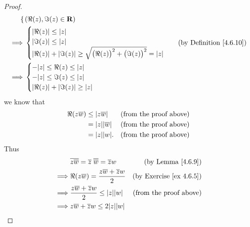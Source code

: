 \begin{proof}
\begin{align*}
\begin{cases}
                   \end{cases} & (\Re(z), \Im(z) \in \mathbf{R}) \\
        \implies & \begin{cases}
                       \abs*{\Re(z)} \leq \abs*{z} \\
                       \abs*{\Im(z)} \leq \abs*{z} \\
                       \abs*{\Re(z)} + \abs*{\Im(z)} \geq \sqrt{\big(\Re(z)\big)^2 + \big(\Im(z)\big)^2} = \abs*{z}
                   \end{cases}                                                 & \text{(by Definition \ref{4.6.10})}                                           \\
        \implies & \begin{cases}
                       -\abs*{z} \leq \Re(z) \leq \abs*{z} \\
                       -\abs*{z} \leq \Im(z) \leq \abs*{z} \\
                       \abs*{\Re(z)} + \abs*{\Im(z)} \geq \abs*{z}
                   \end{cases}
    \end{align*}
    we know that
    \begin{align*}
        \Re(z \overline{w}) & \leq \abs*{z \overline{w}}     & \text{(from the proof above)} \\
                            & = \abs*{z} \abs*{\overline{w}} & \text{(from the proof above)} \\
                            & = \abs*{z} \abs*{w}.           & \text{(from the proof above)}
    \end{align*}
    Thus
    \begin{align*}
                 & \overline{z \overline{w}} = \overline{z} \; \overline{\overline{w}} = \overline{z} w                         & \text{(by Lemma \ref{4.6.9})}                     \\
        \implies & \Re(z \overline{w}) = \frac{z \overline{w} + \overline{z} w}{2}                                              & \text{(by Exercise \ref{ex 4.6.5})}               \\
        \implies & \frac{z \overline{w} + \overline{z} w}{2} \leq \abs*{z} \abs*{w}                                             & \text{(from the proof above)}                     \\
        \implies & z \overline{w} + \overline{z} w \leq 2 \abs*{z} \abs*{w}                                                                                                         \\

\end{align*}
\end{proof}
